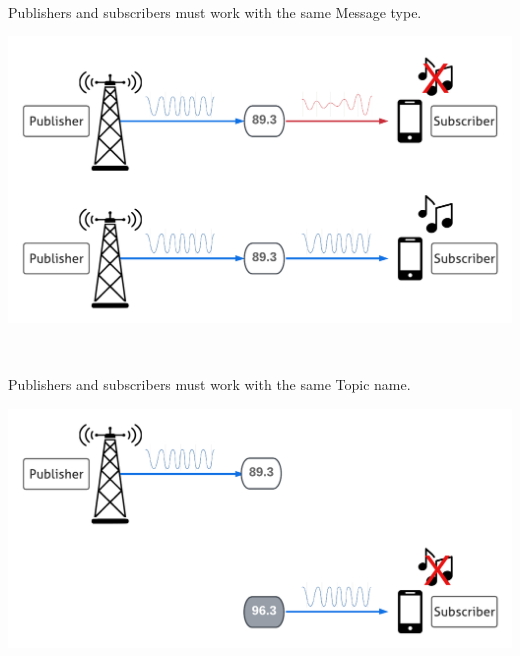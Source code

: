 \documentclass[usenames,11,dvipsnames,svgnames,x11names,aspectratio=1610,bibref]{beamer}
\newcommand{\mydisclaimer}{{\color{disclaimer}{\scriptsize ROS 2 -- Part I}}}
\renewcommand\sec{{\cnordSix{\secname}\hfill\mydisclaimer~} }
\begin{document}
\begin{frame}[fragile]{\sec}
\vspace*{\fill}
\begin{center} 
Publishers and subscribers must work with the same Message type.

\includegraphics[width=.7\linewidth]{figures/lecture2/analogy2.pdf}

\end{center}
\vspace*{\fill}
\end{frame}


\begin{frame}[fragile]{\sec}
\vspace*{\fill}
\begin{center} 
Publishers and subscribers must work with the same Topic name.

\includegraphics[width=.7\linewidth]{figures/lecture2/analogy3.pdf}

\end{center}
\vspace*{\fill}
\end{frame}
\end{document}
